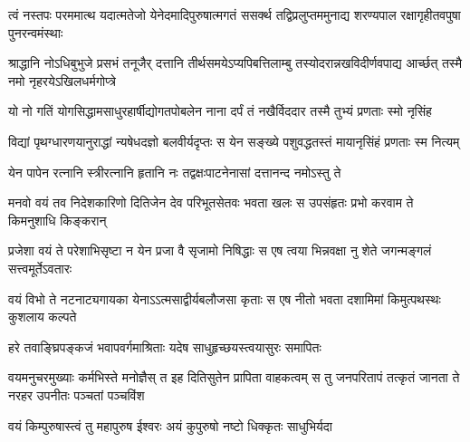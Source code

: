 \fourlineindentedshloka
{त्वं नस्तपः परममात्थ यदात्मतेजो}
{येनेदमादिपुरुषात्मगतं ससर्क्थ}
{तद्विप्रलुप्तममुनाद्य शरण्यपाल}
{रक्षागृहीतवपुषा पुनरन्वमंस्थाः} %



\fourlineindentedshloka
{श्राद्धानि नोऽधिबुभुजे प्रसभं तनूजैर्}
{दत्तानि तीर्थसमयेऽप्यपिबत्तिलाम्बु}
{तस्योदरान्नखविदीर्णवपाद्य आर्च्छत्}
{तस्मै नमो नृहरयेऽखिलधर्मगोप्त्रे} %



\twolineshloka
{यो नो गतिं योगसिद्धामसाधुरहार्षीद्योगतपोबलेन}
{नाना दर्पं तं नखैर्विददार तस्मै तुभ्यं प्रणताः स्मो नृसिंह} %



\fourlineindentedshloka
{विद्यां पृथग्धारणयानुराद्धां}
{न्यषेधदज्ञो बलवीर्यदृप्तः}
{स येन सङ्ख्ये पशुवद्धतस्तं}
{मायानृसिंहं प्रणताः स्म नित्यम्} %



\twolineshloka
{येन पापेन रत्नानि स्त्रीरत्नानि हृतानि नः}
{तद्वक्षःपाटनेनासां दत्तानन्द नमोऽस्तु ते} %



\fourlineindentedshloka
{मनवो वयं तव निदेशकारिणो}
{दितिजेन देव परिभूतसेतवः}
{भवता खलः स उपसंहृतः प्रभो}
{करवाम ते किमनुशाधि किङ्करान्} %



\fourlineindentedshloka
{प्रजेशा वयं ते परेशाभिसृष्टा}
{न येन प्रजा वै सृजामो निषिद्धाः}
{स एष त्वया भिन्नवक्षा नु शेते}
{जगन्मङ्गलं सत्त्वमूर्तेऽवतारः} %



\fourlineindentedshloka
{वयं विभो ते नटनाट्यगायका}
{येनाऽऽत्मसाद्वीर्यबलौजसा कृताः}
{स एष नीतो भवता दशामिमां}
{किमुत्पथस्थः कुशलाय कल्पते} %



\twolineshloka
{हरे तवाङ्घ्रिपङ्कजं भवापवर्गमाश्रिताः}
{यदेष साधुहृच्छयस्त्वयासुरः समापितः} %



\fourlineindentedshloka
{वयमनुचरमुख्याः कर्मभिस्ते मनोज्ञैस्}
{त इह दितिसुतेन प्रापिता वाहकत्वम्}
{स तु जनपरितापं तत्कृतं जानता ते}
{नरहर उपनीतः पञ्चतां पञ्चविंश} %



\twolineshloka
{वयं किम्पुरुषास्त्वं तु महापुरुष ईश्वरः}
{अयं कुपुरुषो नष्टो धिक्कृतः साधुभिर्यदा} %

